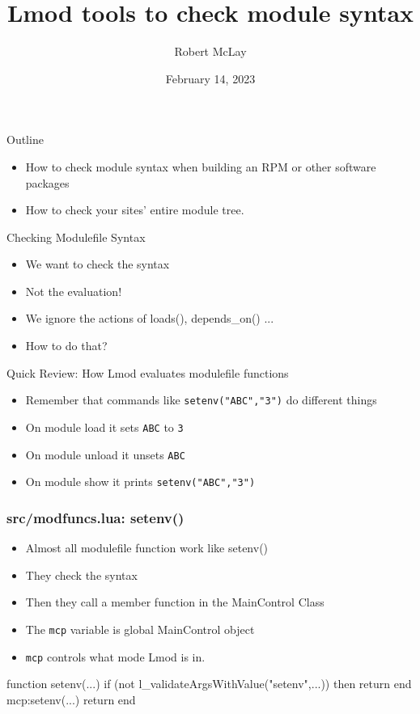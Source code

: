 \documentclass{beamer}
\begin{document}
\title[Lmod]{Lmod tools to check module syntax}
\author{Robert McLay} 
\date{February 14, 2023}

\frame{\titlepage} 


\begin{frame}{Outline}
  \begin{itemize}
    \item How to check module syntax when building an RPM or other
      software packages
    \item How to check your sites' entire module tree.
  \end{itemize}
\end{frame}

\begin{frame}{Checking Modulefile Syntax}
  \begin{itemize}
    \item We want to check the syntax
    \item Not the evaluation!
    \item We ignore the actions of loads(), depends\_on() ...
    \item How to do that?
  \end{itemize}
\end{frame}

\begin{frame}{Quick Review: How Lmod evaluates modulefile functions}
  \begin{itemize}
    \item Remember that commands like \texttt{setenv("ABC","3")} do
      different things
    \item On module load it sets \texttt{ABC} to \texttt{3}
    \item On module unload it unsets \texttt{ABC}
    \item On module show it prints \texttt{setenv("ABC","3")}
  \end{itemize}
\end{frame}

\begin{frame}[fragile]
    \frametitle{src/modfuncs.lua: setenv()}
  \begin{itemize}
    \item Almost all modulefile function work like setenv()
    \item They check the syntax
    \item Then they call a member function in the MainControl Class
    \item The \texttt{mcp} variable is global MainControl object
    \item \texttt{mcp} controls what mode Lmod is in.
  \end{itemize}
 {\tiny
    \begin{semiverbatim}
function setenv(...)
   if (not l_validateArgsWithValue("setenv",...)) then 
     return 
   end
   mcp:setenv(...)
   return
end
    \end{semiverbatim}
}
\end{frame}
\end{document}
